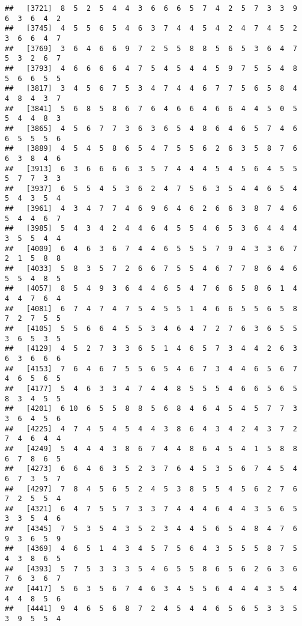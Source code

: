\documentclass[
]{book}
\begin{document}
\begin{verbatim}
##   [3721]  8  5  2  5  4  4  3  6  6  6  5  7  4  2  5  7  3  3  9  6  3  6  4  2
##   [3745]  4  5  5  6  5  4  6  3  7  4  4  5  4  2  4  7  4  5  2  3  6  6  4  7
##   [3769]  3  6  4  6  6  9  7  2  5  5  8  8  5  6  5  3  6  4  7  5  3  2  6  7
##   [3793]  4  6  6  6  6  4  7  5  4  5  4  4  5  9  7  5  5  4  8  5  6  6  5  5
##   [3817]  3  4  5  6  7  5  3  4  7  4  4  6  7  7  5  6  5  8  4  4  8  4  3  7
##   [3841]  5  6  8  5  8  6  7  6  4  6  6  4  6  6  4  4  5  0  5  5  4  4  8  3
##   [3865]  4  5  6  7  7  3  6  3  6  5  4  8  6  4  6  5  7  4  6  6  5  5  5  6
##   [3889]  4  5  4  5  8  6  5  4  7  5  5  6  2  6  3  5  8  7  6  6  3  8  4  6
##   [3913]  6  3  6  6  6  6  3  5  7  4  4  4  5  4  5  6  4  5  5  5  7  7  3  3
##   [3937]  6  5  5  4  5  3  6  2  4  7  5  6  3  5  4  4  6  5  4  5  4  3  5  4
##   [3961]  4  3  4  7  7  4  6  9  6  4  6  2  6  6  3  8  7  4  6  5  4  4  6  7
##   [3985]  5  4  3  4  2  4  4  6  4  5  5  4  6  5  3  6  4  4  4  3  5  5  4  4
##   [4009]  6  4  6  3  6  7  4  4  6  5  5  5  7  9  4  3  3  6  7  2  1  5  8  8
##   [4033]  5  8  3  5  7  2  6  6  7  5  5  4  6  7  7  8  6  4  6  5  5  4  8  5
##   [4057]  8  5  4  9  3  6  4  4  6  5  4  7  6  6  5  8  6  1  4  4  4  7  6  4
##   [4081]  6  7  4  7  4  7  5  4  5  5  1  4  6  6  5  5  6  5  8  7  2  7  5  5
##   [4105]  5  5  6  6  4  5  5  3  4  6  4  7  2  7  6  3  6  5  5  3  6  5  3  5
##   [4129]  4  5  2  7  3  3  6  5  1  4  6  5  7  3  4  4  2  6  3  6  3  6  6  6
##   [4153]  7  6  4  6  7  5  5  6  5  4  6  7  3  4  4  6  5  6  7  4  6  5  6  5
##   [4177]  5  4  6  3  3  4  7  4  4  8  5  5  5  4  6  6  5  6  5  8  3  4  5  5
##   [4201]  6 10  6  5  5  8  8  5  6  8  4  6  4  5  4  5  7  7  3  3  6  4  5  6
##   [4225]  4  7  4  5  4  5  4  4  3  8  6  4  3  4  2  4  3  7  2  7  4  6  4  4
##   [4249]  5  4  4  4  3  8  6  7  4  4  8  6  4  5  4  1  5  8  8  6  7  8  6  5
##   [4273]  6  6  4  6  3  5  2  3  7  6  4  5  3  5  6  7  4  5  4  6  7  3  5  7
##   [4297]  7  8  4  5  6  5  2  4  5  3  8  5  5  4  5  6  2  7  6  7  2  5  5  4
##   [4321]  6  4  7  5  5  7  3  3  7  4  4  4  6  4  4  3  5  6  5  3  3  5  4  6
##   [4345]  7  5  3  5  4  3  5  2  3  4  4  5  6  5  4  8  4  7  6  9  3  6  5  9
##   [4369]  4  6  5  1  4  3  4  5  7  5  6  4  3  5  5  5  8  7  5  4  3  8  6  5
##   [4393]  5  7  5  3  3  3  5  4  6  5  5  8  6  5  6  2  6  3  6  7  6  3  6  7
##   [4417]  5  6  3  5  6  7  4  6  3  4  5  5  6  4  4  4  3  5  4  4  4  8  5  6
##   [4441]  9  4  6  5  6  8  7  2  4  5  4  4  6  5  6  5  3  3  5  3  9  5  5  4

\end{verbatim}
\end{document}
